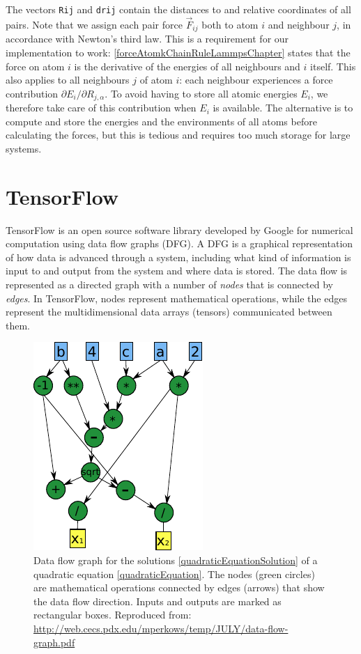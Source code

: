 \documentclass[twoside,english]{uiofysmaster}
\begin{document}
The vectors \texttt{Rij} and \texttt{drij} contain the distances to and relative coordinates of all 
pairs. Note that we assign each pair force $\vec{F}_{ij}$ both to atom $i$ and neighbour $j$, in accordance with 
Newton's third law. This is a requirement for our implementation 
to work: \eqref{forceAtomkChainRuleLammpsChapter} states that
the force on atom $i$ is the derivative of the energies of all neighbours and $i$ itself. This also applies to all neighbours $j$
of atom $i$: each neighbour experiences a force contribution  $\partial E_i / \partial R_{j,\alpha}$. To avoid 
having to store all atomic energies $E_i$, we therefore take care of this contribution when $E_i$ is available. 
The alternative is to compute and store the energies and the environments of all atoms before calculating the forces, but this
is tedious and requires too much storage for large systems. 





\chapter{TensorFlow}
TensorFlow \cite{Abadi15} \cite{Abadi16} is an open source software library 
developed by Google 
for numerical computation using data flow graphs (DFG). 
A DFG is a graphical representation of how data is
advanced through a system, including what kind of information is input
to and output from the system and where data is stored.
The data flow is represented as a directed graph
with a number of \textit{nodes} that is connected by
\textit{edges}. In TensorFlow, nodes represent
mathematical operations, while the edges represent
the multidimensional data arrays (tensors) 
communicated between them.
\begin{figure}
\centering
  \includegraphics[width=0.4\linewidth]{Figures/Implementation/DFG.pdf}
  \caption{Data flow graph for the solutions \eqref{quadraticEquationSolution} of a 
	   quadratic equation \eqref{quadraticEquation}. The nodes (green circles) are mathematical 
	   operations connected by edges (arrows) that show the data flow direction. Inputs and outputs
	   are marked as rectangular boxes. Reproduced from:
  \href{http://web.cecs.pdx.edu/mperkows/temp/JULY/data-flow-graph.pdf}{http://web.cecs.pdx.edu/mperkows/temp/JULY/data-flow-graph.pdf}} 
  \label{fig:DFG}
\end{figure}
\end{document}
